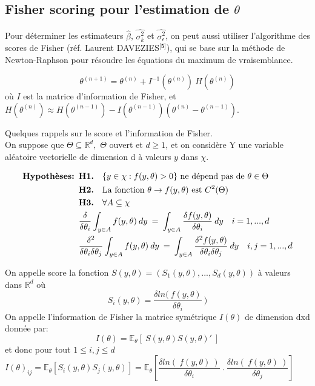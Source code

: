 \documentclass[12pt,fleqn]{book} %
\begin{document}
\vspace{4em}

\subsection{Fisher scoring pour l'estimation de $\theta$}

\vspace{1em}

Pour déterminer les estimateurs $\hat{\beta}$, $\hat{\sigma_k^2}$ et $\hat{\sigma_{\epsilon}^2}$, on peut aussi utiliser l'algorithme des scores de Fisher (réf. Laurent DAVEZIES$^\textbf{[5]}$), qui se base sur la méthode de Newton-Raphson pour résoudre les équations du maximum de vraisemblance. 

\[
\theta^{(n+1)} = \theta^{(n)} + I^{-1}(\theta^{(n)}) \:H(\theta^{(n)}) 
\]
où $I$ est la matrice d'information de Fisher, et  $H(\theta^{(n)})\approx H(\theta^{(n-1)})-I(\theta^{(n-1)})(\theta^{(n)}-\theta^{(n-1)}).$ 

\vspace{1em}

Quelques rappels sur le score et l'information de Fisher.\\

On suppose que $\Theta\subseteq \mathbb{R}^d,$ $\Theta$ ouvert et $d\geq 1$, et on considère Y une variable aléatoire vectorielle de dimension d à valeurs $y$ dans $\chi$.

\vspace{0.5em}

\begin{align*}
\textbf{Hypothèses: } &\textbf{H1.} \quad \{ y\in\chi : f(y,\theta)>0\} \textnormal{ ne dépend pas de } \theta\in\Theta\\
&\textbf{H2.} \quad \textnormal{La fonction } \theta\rightarrow f(y,\theta) \textnormal{ est } C^2(\Theta)\\
&\textbf{H3.} \quad \forall A \subseteq \chi\\ 
& \frac{\delta}{\delta\theta_i} \int_{y\in A} f(y,\theta)\: dy \:=\: \int_{y\in A} \frac{\delta f(y,\theta)}{\delta\theta_i} \:dy  \quad i=1,...,d\\
& \frac{\delta^2}{\delta\theta_i\delta\theta_j} \int_{y\in A} f(y,\theta)\: dy \:=\: \int_{y\in A} \frac{\delta^2  f(y,\theta)}{\delta\theta_i\delta\theta_j}\: dy \quad i,j=1,...,d
\end{align*}
 
\newpage 

\begin{definition}
On appelle score la fonction $S(y,\theta)=\left( S_1(y,\theta), ..., S_d(y,\theta) \right)$ à valeurs dans $\mathbb{R}^d$ où
\[
S_i(y,\theta)=\frac{\delta ln(\:f(y,\theta)}{\delta \theta_i} \:)
\]
On appelle l'information de Fisher la matrice symétrique $I(\theta)$ de dimension d\:x\:d donnée par: 
\[
I(\theta)=\mathbb{E}_\theta\left[\: S(y,\theta) S(y,\theta)'  \:\right]
\]
et donc pour tout $ 1 \leq i,j \leq d$
\[
I(\theta)_{ij}=\mathbb{E}_\theta\left[ S_i(y,\theta) S_j(y,\theta)\right]=\mathbb{E}_\theta\left[  \frac{\delta ln(\:f(y,\theta)\:)}{\delta \theta_i} \:.\:  \frac{\delta ln(\:f(y,\theta)\:)}{\delta \theta_j} \right] \qquad 
\] 
\end{definition}
\end{document}
